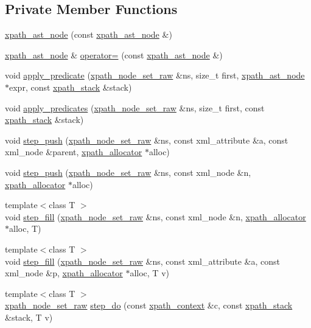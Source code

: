 \subsection*{Private Member Functions}
\begin{DoxyCompactItemize}
\item 
\hyperlink{classxpath__ast__node_ae5a059e41b41505bef1f7dbebda8070b}{xpath\_\-ast\_\-node} (const \hyperlink{classxpath__ast__node}{xpath\_\-ast\_\-node} \&)
\item 
\hyperlink{classxpath__ast__node}{xpath\_\-ast\_\-node} \& \hyperlink{classxpath__ast__node_a60fddea92b095c2b8705f12f7309e6aa}{operator=} (const \hyperlink{classxpath__ast__node}{xpath\_\-ast\_\-node} \&)
\item 
void \hyperlink{classxpath__ast__node_afcefe6b386c214349c5e23f13828fa1e}{apply\_\-predicate} (\hyperlink{classxpath__node__set__raw}{xpath\_\-node\_\-set\_\-raw} \&ns, size\_\-t first, \hyperlink{classxpath__ast__node}{xpath\_\-ast\_\-node} $\ast$expr, const \hyperlink{structxpath__stack}{xpath\_\-stack} \&stack)
\item 
void \hyperlink{classxpath__ast__node_ae5e3b5fec836d9478ebd195dda7fdedd}{apply\_\-predicates} (\hyperlink{classxpath__node__set__raw}{xpath\_\-node\_\-set\_\-raw} \&ns, size\_\-t first, const \hyperlink{structxpath__stack}{xpath\_\-stack} \&stack)
\item 
void \hyperlink{classxpath__ast__node_aa141bfbd4d5e42da83f0de8f729eb849}{step\_\-push} (\hyperlink{classxpath__node__set__raw}{xpath\_\-node\_\-set\_\-raw} \&ns, const xml\_\-attribute \&a, const xml\_\-node \&parent, \hyperlink{classxpath__allocator}{xpath\_\-allocator} $\ast$alloc)
\item 
void \hyperlink{classxpath__ast__node_a7083f1a6c3d4128bb8a4ac147851a86b}{step\_\-push} (\hyperlink{classxpath__node__set__raw}{xpath\_\-node\_\-set\_\-raw} \&ns, const xml\_\-node \&n, \hyperlink{classxpath__allocator}{xpath\_\-allocator} $\ast$alloc)
\item 
{\footnotesize template$<$class T $>$ }\\void \hyperlink{classxpath__ast__node_a2fb0bf78cbdbe0bb032d37f765eab816}{step\_\-fill} (\hyperlink{classxpath__node__set__raw}{xpath\_\-node\_\-set\_\-raw} \&ns, const xml\_\-node \&n, \hyperlink{classxpath__allocator}{xpath\_\-allocator} $\ast$alloc, T)
\item 
{\footnotesize template$<$class T $>$ }\\void \hyperlink{classxpath__ast__node_a0da76bbadd9b254cf56649392c686c2a}{step\_\-fill} (\hyperlink{classxpath__node__set__raw}{xpath\_\-node\_\-set\_\-raw} \&ns, const xml\_\-attribute \&a, const xml\_\-node \&p, \hyperlink{classxpath__allocator}{xpath\_\-allocator} $\ast$alloc, T v)
\item 
{\footnotesize template$<$class T $>$ }\\\hyperlink{classxpath__node__set__raw}{xpath\_\-node\_\-set\_\-raw} \hyperlink{classxpath__ast__node_a326147ab8def5110e44deafd73b20393}{step\_\-do} (const \hyperlink{structxpath__context}{xpath\_\-context} \&c, const \hyperlink{structxpath__stack}{xpath\_\-stack} \&stack, T v)
\end{DoxyCompactItemize}
